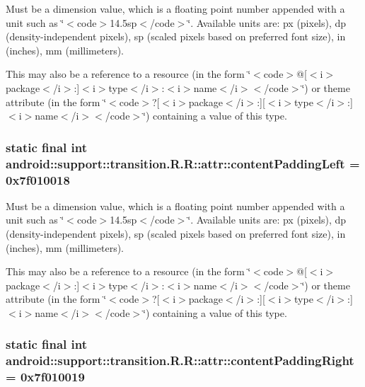 Must be a dimension value, which is a floating point number appended with a unit such as \char`\"{}$<$code$>$14.5sp$<$/code$>$\char`\"{}. Available units are: px (pixels), dp (density-independent pixels), sp (scaled pixels based on preferred font size), in (inches), mm (millimeters). 

This may also be a reference to a resource (in the form \char`\"{}$<$code$>$@\mbox{[}$<$i$>$package$<$/i$>$:\mbox{]}$<$i$>$type$<$/i$>$:$<$i$>$name$<$/i$>$$<$/code$>$\char`\"{}) or theme attribute (in the form \char`\"{}$<$code$>$?\mbox{[}$<$i$>$package$<$/i$>$:\mbox{]}\mbox{[}$<$i$>$type$<$/i$>$:\mbox{]}$<$i$>$name$<$/i$>$$<$/code$>$\char`\"{}) containing a value of this type. \hypertarget{classandroid_1_1support_1_1transition_1_1_r_1_1attr_585eb6f7dc4355ec31c8da8b942f99c0}{
\subsubsection[{contentPaddingLeft}]{\setlength{\rightskip}{0pt plus 5cm}static final int android::support::transition.R.R::attr::contentPaddingLeft = 0x7f010018}}
\label{classandroid_1_1support_1_1transition_1_1_r_1_1attr_585eb6f7dc4355ec31c8da8b942f99c0}


Must be a dimension value, which is a floating point number appended with a unit such as \char`\"{}$<$code$>$14.5sp$<$/code$>$\char`\"{}. Available units are: px (pixels), dp (density-independent pixels), sp (scaled pixels based on preferred font size), in (inches), mm (millimeters). 

This may also be a reference to a resource (in the form \char`\"{}$<$code$>$@\mbox{[}$<$i$>$package$<$/i$>$:\mbox{]}$<$i$>$type$<$/i$>$:$<$i$>$name$<$/i$>$$<$/code$>$\char`\"{}) or theme attribute (in the form \char`\"{}$<$code$>$?\mbox{[}$<$i$>$package$<$/i$>$:\mbox{]}\mbox{[}$<$i$>$type$<$/i$>$:\mbox{]}$<$i$>$name$<$/i$>$$<$/code$>$\char`\"{}) containing a value of this type. \hypertarget{classandroid_1_1support_1_1transition_1_1_r_1_1attr_a059552fec76beb848eb80239e05d29e}{
\subsubsection[{contentPaddingRight}]{\setlength{\rightskip}{0pt plus 5cm}static final int android::support::transition.R.R::attr::contentPaddingRight = 0x7f010019}}
\label{classandroid_1_1support_1_1transition_1_1_r_1_1attr_a059552fec76beb848eb80239e05d29e}


